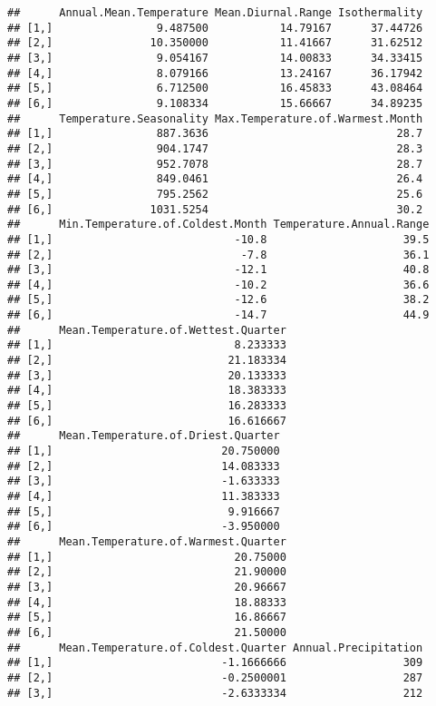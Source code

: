 \documentclass[]{article}
\begin{document}
\begin{verbatim}
##      Annual.Mean.Temperature Mean.Diurnal.Range Isothermality
## [1,]                9.487500           14.79167      37.44726
## [2,]               10.350000           11.41667      31.62512
## [3,]                9.054167           14.00833      34.33415
## [4,]                8.079166           13.24167      36.17942
## [5,]                6.712500           16.45833      43.08464
## [6,]                9.108334           15.66667      34.89235
##      Temperature.Seasonality Max.Temperature.of.Warmest.Month
## [1,]                887.3636                             28.7
## [2,]                904.1747                             28.3
## [3,]                952.7078                             28.7
## [4,]                849.0461                             26.4
## [5,]                795.2562                             25.6
## [6,]               1031.5254                             30.2
##      Min.Temperature.of.Coldest.Month Temperature.Annual.Range
## [1,]                            -10.8                     39.5
## [2,]                             -7.8                     36.1
## [3,]                            -12.1                     40.8
## [4,]                            -10.2                     36.6
## [5,]                            -12.6                     38.2
## [6,]                            -14.7                     44.9
##      Mean.Temperature.of.Wettest.Quarter
## [1,]                            8.233333
## [2,]                           21.183334
## [3,]                           20.133333
## [4,]                           18.383333
## [5,]                           16.283333
## [6,]                           16.616667
##      Mean.Temperature.of.Driest.Quarter
## [1,]                          20.750000
## [2,]                          14.083333
## [3,]                          -1.633333
## [4,]                          11.383333
## [5,]                           9.916667
## [6,]                          -3.950000
##      Mean.Temperature.of.Warmest.Quarter
## [1,]                            20.75000
## [2,]                            21.90000
## [3,]                            20.96667
## [4,]                            18.88333
## [5,]                            16.86667
## [6,]                            21.50000
##      Mean.Temperature.of.Coldest.Quarter Annual.Precipitation
## [1,]                          -1.1666666                  309
## [2,]                          -0.2500001                  287
## [3,]                          -2.6333334                  212

\end{verbatim}
\end{document}
